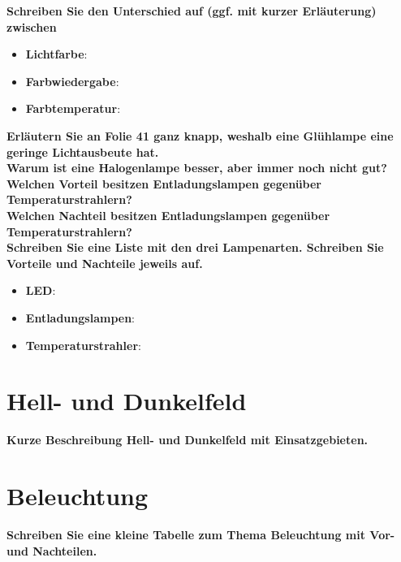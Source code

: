 \documentclass[a4paper]{article}
\begin{document}
	\textbf{Schreiben Sie den Unterschied auf (ggf. mit kurzer Erläuterung) zwischen}\\
	\begin{itemize}
		\item \textbf{Lichtfarbe}:\\
		\item \textbf{Farbwiedergabe}:\\
		\item \textbf{Farbtemperatur}:\\
	\end{itemize}
	
	\textbf{Erläutern Sie an Folie 41 ganz knapp, weshalb eine Glühlampe eine geringe Lichtausbeute hat.}\\
	
	\textbf{Warum ist eine Halogenlampe besser, aber immer noch nicht gut?}\\
	
	\textbf{Welchen Vorteil besitzen Entladungslampen gegenüber Temperaturstrahlern?}\\
	
	\textbf{Welchen Nachteil besitzen Entladungslampen gegenüber Temperaturstrahlern?}\\
	
	\textbf{Schreiben Sie eine Liste mit den drei Lampenarten. Schreiben Sie Vorteile und Nachteile jeweils auf.}\\
	\begin{itemize}
		\item \textbf{LED}:\\
		\item \textbf{Entladungslampen}:\\
		\item \textbf{Temperaturstrahler}:\\
	\end{itemize}
	
	\section{Hell- und Dunkelfeld}
	\textbf{Kurze Beschreibung Hell- und Dunkelfeld mit Einsatzgebieten.}\\
	
	\section{Beleuchtung}
	\textbf{Schreiben Sie eine kleine Tabelle zum Thema Beleuchtung mit Vor- und Nachteilen.}\\
	
\end{document}
